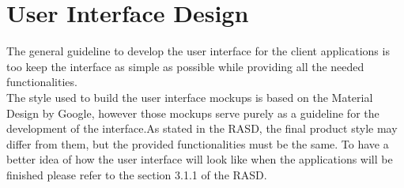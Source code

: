 \chapter{User Interface Design}\label{c:gui}
The general guideline to develop the user interface for the client applications is too keep the interface as simple as possible while providing all the needed functionalities.\\
The style used to build the user interface mockups is based on the Material Design by Google, however those mockups serve purely as a guideline for the development of the interface.As stated in the RASD, the final product style may differ from them, but the provided functionalities must be the same.
To have a better idea of how the user interface will look like when the applications will be finished please refer to the section 3.1.1 of the RASD.